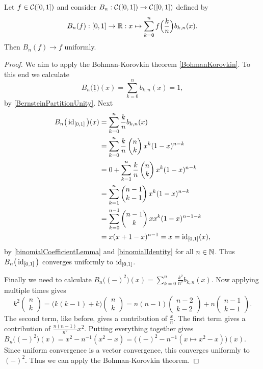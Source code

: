 \begin{proposition}
Let $f\in\cont(\interval{0,1})$ and consider $B_n: \cont(\interval{0,1}) \to \cont(\interval{0,1})$ defined by
\[ B_n(f): \interval{0,1} \to \R: x\mapsto \sum_{k=0}^nf\Big(\frac{k}{n}\Big)b_{k,n}(x). \]
Then $B_n(f) \to f$ uniformly.
\end{proposition}
\begin{proof}
We aim to apply the Bohman-Korovkin theorem \ref{BohmanKorovkin}. To this end we calculate
\[ B_n\big(\underline{1}\big)(x) = \sum_{k=0}^nb_{k,n}(x) = 1, \]
by \ref{BernsteinPartitionUnity}. Next
\begin{align*}
B_n\big(\id_{\interval{0,1}}\big)(x) &= \sum_{k=0}^n \frac{k}{n}b_{k,n}(x) \\
&= \sum_{k=0}^n \frac{k}{n} \begin{pmatrix}
n \\ k
\end{pmatrix}x^k(1-x)^{n-k} \\
&= 0 + \sum_{k=1}^{n} \frac{k}{n}\begin{pmatrix}
n \\ k
\end{pmatrix}x^k(1-x)^{n-k} \\
&= \sum_{k=1}^{n} \begin{pmatrix}
n-1 \\ k-1
\end{pmatrix}x^k(1-x)^{n-k} \\
&= \sum_{k=0}^{n-1} \begin{pmatrix}
n-1 \\ k
\end{pmatrix}xx^{k}(1-x)^{n-1-k} \\
&= x (x + 1 - x)^{n-1} = x = \id_{\interval{0,1}}(x),
\end{align*}
by \ref{binomialCoefficientLemma} and \ref{binomialIdentity} for all $n\in \mathbb{N}$. Thus $B_n\big(\id_{\interval{0,1}}\big)$ converges uniformly to $\id_{\interval{0,1}}$.

Finally we need to calculate $B_n\big((-)^2\big)(x) = \sum_{k=0}^n \frac{k^2}{n^2}b_{k,n}(x)$. Now applying multiple times gives
\[ k^2 \begin{pmatrix}
n \\ k
\end{pmatrix} = \big(k(k-1) + k\big)\begin{pmatrix}
n \\ k
\end{pmatrix} = n(n-1) \begin{pmatrix}
n - 2 \\ k - 2
\end{pmatrix} + n \begin{pmatrix}
n-1 \\ k-1
\end{pmatrix}. \]
The second term, like before, gives a contribution of $\frac{x}{n}$. The first term gives a contribution of $\frac{n(n-1)}{n^2}x^2$. Putting everything together gives $B_n\big((-)^2\big)(x) = x^2 - n^{-1}(x^2-x) = \big((-)^2 - n^{-1}(x\mapsto x^2 - x)\big)(x)$. Since uniform convergence is a vector convergence, this converges uniformly to $(-)^2$. Thus we can apply the Bohman-Korovkin theorem.
\end{proof}
